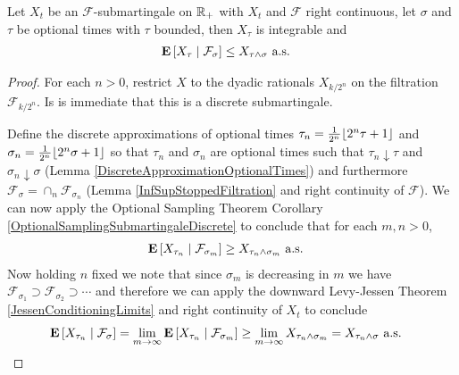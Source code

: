\begin{thm}\label{OptionalSamplingContinuous}Let $X_t$ be an $\mathcal{F}$-submartingale on $\reals_+$
  with $X_t$ and $\mathcal{F}$ right continuous, let $\sigma$ and
  $\tau$ be optional times with $\tau$ bounded, then $X_\tau$ is
  integrable and
\begin{align*}
\cexpectationlong{\mathcal{F}_\sigma}{X_\tau} &\leq X_{\tau \wedge
  \sigma} \text{ a.s.}
\end{align*}
\end{thm}
\begin{proof}
For each $n>0$, restrict $X$ to the dyadic rationals $X_{k/2^n}$ on the
filtration $\mathcal{F}_{k/2^n}$.  Is is immediate that this is a
discrete submartingale.

Define the discrete approximations of optional times $\tau_n =
\frac{1}{2^n} \floor{2^n \tau + 1}$ and $\sigma_n = \frac{1}{2^n}
\floor{2^n \sigma + 1}$ so that $\tau_n$ and $\sigma_n$ are optional
times such that $\tau_n \downarrow \tau$ and $\sigma_n \downarrow
\sigma$ (Lemma \ref{DiscreteApproximationOptionalTimes}) and
furthermore $\mathcal{F}_\sigma = \cap_n \mathcal{F}_{\sigma_n}$ (Lemma
\ref{InfSupStoppedFiltration} and right
continuity of $\mathcal{F}$).
We can now apply the Optional Sampling Theorem Corollary
\ref{OptionalSamplingSubmartingaleDiscrete} to conclude that for each
$m,n>0$,
\begin{align*}
\cexpectationlong{\mathcal{F}_{\sigma_m}}{X_{\tau_n}} &\geq X_{\tau_n \wedge
  \sigma_m} \text{ a.s.}
\end{align*}
Now holding $n$ fixed we note that since $\sigma_m$ is decreasing in
$m$ we have $\mathcal{F}_{\sigma_1} \supset
\mathcal{F}_{\sigma_{2}} \supset \cdots$ and therefore we can apply
the downward Levy-Jessen Theorem \ref {JessenConditioningLimits} and
right continuity of $X_t$ to
conclude 
\begin{align*}
\cexpectationlong{\mathcal{F}_{\sigma}}{X_{\tau_n}} &=\lim_{m \to
  \infty} \cexpectationlong{\mathcal{F}_{\sigma_m}}{X_{\tau_n}}  \geq
\lim_{m \to \infty} X_{\tau_n \wedge  \sigma_m} 
= X_{\tau_n \wedge \sigma} \text{ a.s.}
\end{align*}


\end{proof}
